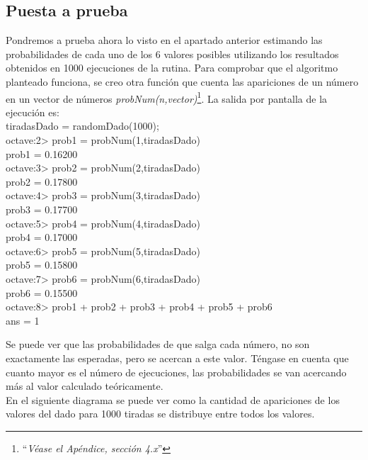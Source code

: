 \documentclass{article}
\begin{document}

\bigskip


\subsection{Puesta a prueba}

Pondremos a prueba ahora lo visto en el apartado anterior estimando las probabilidades de cada uno de los 6 valores posibles utilizando los resultados obtenidos en 1000 ejecuciones de la rutina. Para comprobar que el algoritmo planteado funciona, se creo otra función que cuenta las apariciones de un número en un vector de números \textit{probNum(n,vector)}\footnote{``\textit{Véase el Apéndice, sección 4.x}''}. La salida por pantalla de la ejecución es: \\

{\ttfamily\footnotesize
\indent tiradasDado = randomDado(1000);\\
\indent octave:2> prob1 = probNum(1,tiradasDado)\\
\indent prob1 =  0.16200 \\
\indent octave:3> prob2 = probNum(2,tiradasDado)\\
\indent prob2 =  0.17800\\
\indent octave:4> prob3 = probNum(3,tiradasDado)\\
\indent prob3 =  0.17700\\
\indent octave:5> prob4 = probNum(4,tiradasDado)\\
\indent prob4 =  0.17000\\
\indent octave:6> prob5 = probNum(5,tiradasDado)\\
\indent prob5 =  0.15800\\
\indent octave:7> prob6 = probNum(6,tiradasDado)\\
\indent prob6 =  0.15500\\
\indent octave:8> prob1 + prob2 + prob3 + prob4 + prob5 + prob6\\
\indent ans =  1\\}

Se puede ver que las probabilidades de que salga cada número, no son exactamente las esperadas, pero se acercan a este valor. Téngase en cuenta que cuanto mayor es el número de ejecuciones, las probabilidades se van acercando más al valor calculado teóricamente. \\
En el siguiente diagrama se puede ver como la cantidad de apariciones de los valores del dado  para 1000 tiradas se distribuye entre todos los valores. 
\end{document}
